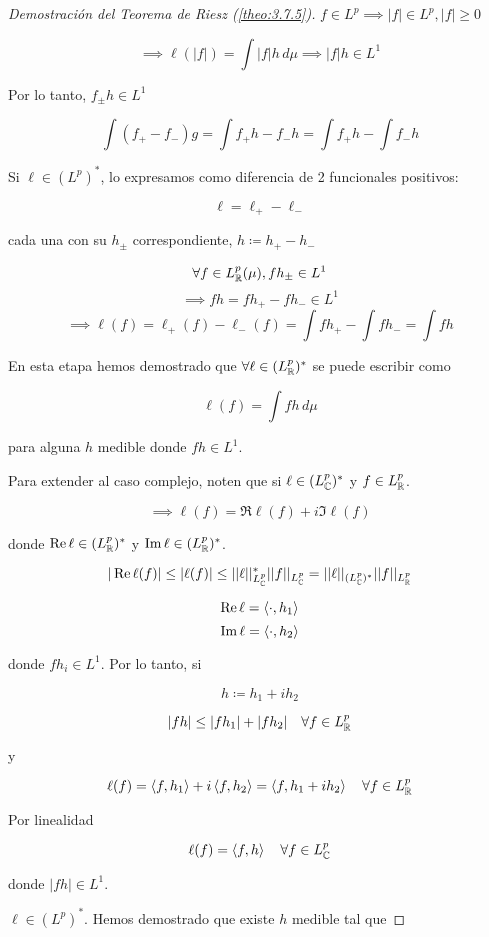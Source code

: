 \begin{proof}[Demostración del Teorema de Riesz (\ref{theo:3.7.5})]
        $f\in L^p\implies |f|\in L^p,|f|\geq 0$

        \[\implies \ell(|f|)=\int |f|h\,d\mu\implies |f|h\in L^1\]

        Por lo tanto, $f_{\pm}h\in L^1$

        \[\int (f_+-f_-)g=\int f_+h-f_-h=\int f_+h-\int f_-h\]

        Si $\ell\in (L^p)^*$, lo expresamos como diferencia de 2 funcionales positivos:

        \[\ell=\ell_+-\ell_-\]

        cada una con su $h_\pm$ correspondiente, $h\coloneqq h_+-h_-$

        \[\forall f\in L^p_{\mathbb{R}}(\mu), fh_\pm \in L^1\]
        \[\implies fh=fh_+-fh_-\in L^1\]
        \[\implies \ell(f)=\ell_+(f)-\ell_-(f)=\int fh_+-\int fh_-=\int fh\]

        En esta etapa hemos demostrado que $\forall \ell\in (L_{\mathbb{R}}^p)^*$ se puede escribir como 

        \[\ell(f)=\int fh\,d\mu\]

        para alguna $h$ medible donde $fh\in L^1$.

        Para extender al caso complejo, noten que si $\ell\in (L_{\mathbb{C}}^p)^*$ y $f\in L^p_{\mathbb{R}}$.

        \[\implies \ell(f)=\Re\ell(f)+i\Im\ell(f)\]

        donde $\operatorname{Re} \ell\in (L_{\mathbb{R}}^p)^*$ y $\operatorname{Im} \ell\in (L^p_{\mathbb{R}})^*$.

        \[|\operatorname{Re} \ell(f)|\leq |\ell(f)|\leq ||\ell||_{L_{\mathbb{C}}^p}^*||f||_{L_{\mathbb{C}}^p}=||\ell||_{(L_{\mathbb{C}}^p)^*}||f||_{L^p_{\mathbb{R}}}\]

        \[\operatorname{Re} \ell=\left\langle \cdot,h_1\right\rangle\]
        \[\operatorname{Im} \ell=\left\langle \cdot,h_2\right\rangle\]

        donde $fh_i\in L^1$. Por lo tanto, si 

        \[h\coloneqq h_1+ih_2\]

        \[|fh|\leq |fh_1|+|fh_2|\quad \forall f\in L_{\mathbb{R}}^p\]

        y 

        \[\ell(f)=\left\langle f,h_1\right\rangle+i\left\langle f,h_2\right\rangle=\left\langle f,h_1+ih_2\right\rangle\quad \forall f\in L^p_{\mathbb{R}}\]

        Por linealidad 

        \[\ell(f)=\left\langle f,h\right\rangle\quad\forall f\in L_{\mathbb{C}}^p\]

        donde $|fh|\in L^1$.

        $\ell\in (L^p)^*$. Hemos demostrado que existe $h$  medible tal que 


\end{proof}

